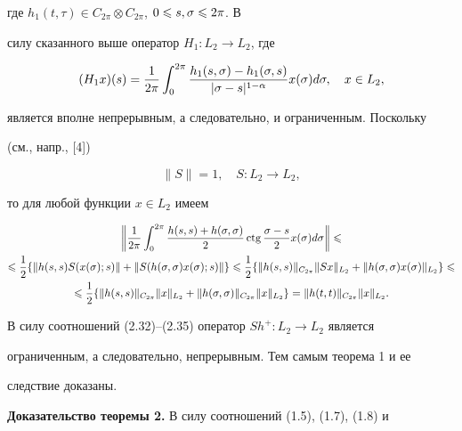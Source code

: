 где $h_1(t,\tau)\in C_{2\pi}\otimes C_{2\pi}$, $0\leqslant s,\sigma \leqslant 2\pi$. В


силу сказанного выше оператор $H_1:L_2\to L_2$, где


\begin{equation}


(H_1x)(s) = \frac{1}{2\pi}\int_{0}^{2\pi}\frac{h_1(s,\si)-


h_1(\si,s)}{|\si-s|^{1-\alpha}}x(\si)d\si,\quad x\in L_2,


\end{equation}


является вполне непрерывным, а следовательно, и ограниченным. Поскольку


(см., напр., [4])


\begin{equation}


\|S\| = 1,\quad S:L_2\to L_2,


\end{equation}


то для любой функции $x\in L_2$ имеем


\begin{multline}


\left\|\frac{1}{2\pi}\int_{0}^{2\pi}\frac{h(s,s)+h(\si,\si)}{2}\ctg\frac{\si-


s}{2}x(\si)d\si\right\|\lea\\


\lea\frac{1}{2}\{\|h(s,s)S(x(\si);s)\|+\|S(h(\si,\si)x(\si);s)\|\}\lea


\frac{1}{2}\{\|h(s,s)\|_{C_{2\pi}}\|Sx\|_{L_2}+


\|h(\si,\si)x(\si)\|_{L_2}\}\lea\\


\lea\frac{1}{2}\{\|h(s,s)\|_{C_{2\pi}}\|x\|_{L_2}+\|h(\si,\si)


\|_{C_{2\pi}}\|x\|_{L_2}\} =


\|h(t,t)\|_{C_{2\pi}}\|x\|_{L_2}.


\end{multline}


В силу соотношений (2.32)--(2.35) оператор $Sh^+:L_2\to L_2$ является


ограниченным, а следовательно, непрерывным. Тем самым теорема 1 и ее


следствие доказаны.


\medskip





{\bf Доказательство теоремы 2.} В силу соотношений (1.5), (1.7), (1.8) и


